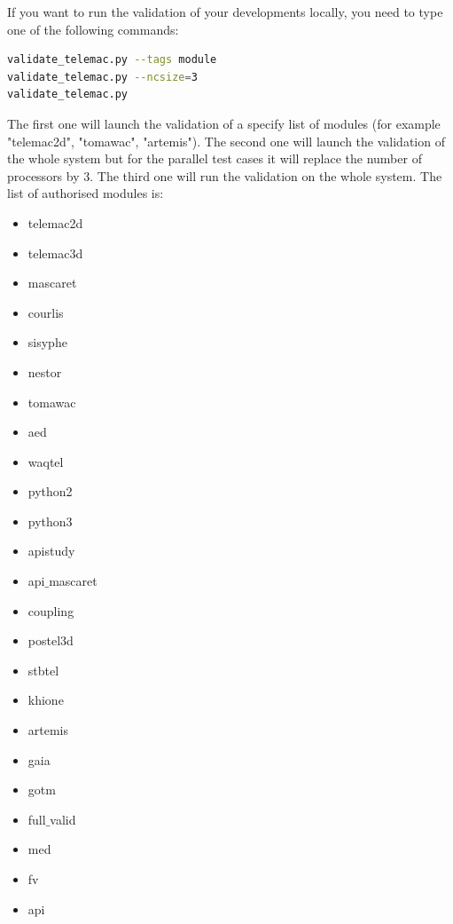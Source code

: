 If you want to run the validation of your developments locally, you need to type one of the following commands:
\begin{lstlisting}[language=bash]
validate_telemac.py --tags module
validate_telemac.py --ncsize=3
validate_telemac.py
\end{lstlisting}
The first one will launch the validation of a specify list of modules (for example
"telemac2d", "tomawac", "artemis").
The second one will launch the validation of the whole system but for the
parallel test cases it will replace the number of processors by 3.
The third one will run the validation on the whole system.
The list of authorised modules is:
\begin{itemize}
\item telemac2d
\item telemac3d
\item mascaret
\item courlis
\item sisyphe
\item nestor
\item tomawac
\item aed
\item waqtel
\item python2
\item python3
\item apistudy
\item api$\_$mascaret
\item coupling
\item postel3d
\item stbtel
\item khione
\item artemis
\item gaia
\item gotm
\item full$\_$valid
\item med
\item fv
\item api
\end{itemize}

%
%
%
%
%
%
%
%
